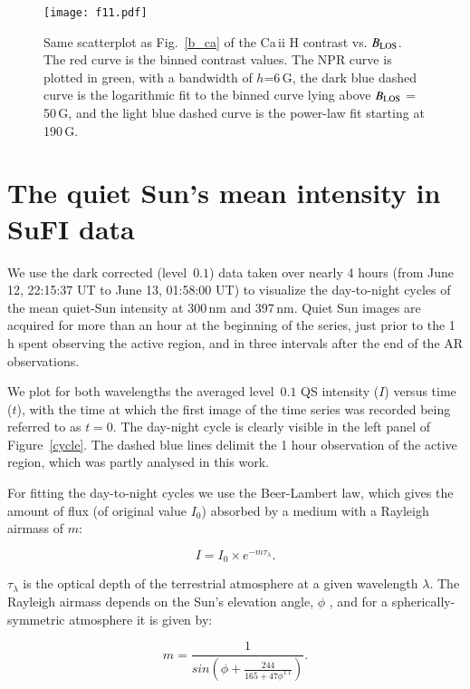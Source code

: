 \documentclass[goettingen, gauss, print]{thesis}
\begin{document}
\begin{figure}
\centering
\texttt{[image: f11.pdf]}
\caption{Same scatterplot as Fig.~\ref{b_ca} of the Ca\,{\sc ii} H contrast vs. $B_{\rm LOS}$. The red curve is the binned contrast values. The NPR curve is plotted in green, with a bandwidth of $h$=6\,G, the dark blue dashed curve is the logarithmic fit to the binned curve lying above $B_{\rm LOS}$ = 50\,G, and the light blue dashed curve is the power-law fit starting at 190\,G. }
\label{b_ca_smooth}
\end{figure}


\chapter{The quiet Sun's mean intensity in SuFI data}
\label{appendix_B}

We use the dark corrected (level~$0.1$) data taken over nearly 4 hours (from June 12, 22:15:37 UT to June 13, 01:58:00 UT) to visualize the day-to-night cycles of the mean quiet-Sun intensity at 300\,nm and 397\,nm. Quiet Sun images are acquired for more than an hour at the beginning of the series, just prior to the 1\,h spent observing the active region, and in three intervals after the end of the AR observations. 

We plot for both wavelengths the averaged level~$0.1$ QS intensity ($I$) versus time ($t$), with the time at which the first image of the time series was recorded being referred to as $t=0$. The day-night cycle is clearly visible in the left panel of Figure~\ref{cycle}. The dashed blue lines delimit the 1 hour observation of the active region, which was partly analysed in this work.

For fitting the day-to-night cycles we use the Beer-Lambert law, which gives the amount of flux (of original value $I_0$) absorbed by a medium with a Rayleigh airmass of $m$: 

\begin{equation}
I = I_0  \times e^{- m\tau_{\lambda}}.
\label{beer}
\end{equation}

$\tau_{\lambda}$ is the optical depth of the terrestrial atmosphere at a given wavelength $\lambda$. The Rayleigh airmass depends on the Sun's elevation angle, $\phi$ \citep{pickering_southern_2002}, and for a spherically-symmetric atmosphere it is given by:

\begin{equation}
m = \frac{1}{sin(\phi +\frac{244}{165 + 47\phi^{1.1}})}.
\end{equation} 
\end{document}
